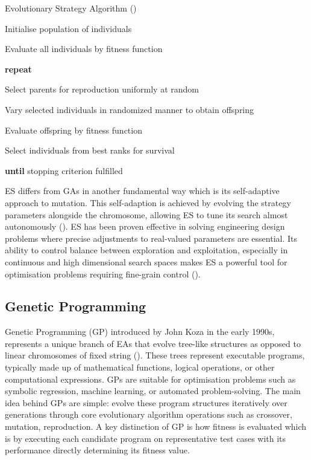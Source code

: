 \begin{algorithm}
	\caption{Evolutionary Strategy Algorithm (\cite{back2012handbook})}\label{alg:basic_evolutionary_strategy}
	\begin{algorithmic}[1]
	\item Initialise population of individuals
	\item Evaluate all individuals  by fitness function
	\item \textbf{repeat}
	\item \quad Select parents for reproduction uniformly at random
	\item \quad Vary selected individuals in randomized manner to obtain offspring
	\item \quad Evaluate offspring by fitness function
	\item \quad Select individuals from best ranks for survival
	\item \textbf{until} stopping criterion fulfilled
\end{algorithmic}
\end{algorithm}

\noindent ES differs from GAs in another fundamental way which is its self-adaptive approach to mutation. This self-adaption is achieved by evolving the strategy parameters alongside the chromosome, allowing ES to tune its search almost autonomously (\cite{back2012handbook}). ES has been proven effective in solving engineering design problems where precise adjustments to real-valued parameters are essential. Its ability to control balance between exploration and exploitation, especially in continuous and high dimensional search spaces makes ES a powerful tool for optimisation problems requiring fine-grain control (\cite{book_introduction_to_evolutionary_computing}). \bigskip

\subsection{Genetic Programming}\label{sec:genetic_programming}
Genetic Programming (GP) introduced by John Koza in the early 1990s, represents a unique branch of EAs that evolve tree-like structures as opposed to linear chromosomes of fixed string (\cite{koza1994genetic}). These trees represent executable programs, typically made up of mathematical functions, logical operations, or other computational expressions. GPs are suitable for optimisation problems such as symbolic regression, machine learning, or automated problem-solving. The main idea behind GPs are simple: evolve these program structures iteratively over generations through core evolutionary algorithm operations such as crossover, mutation, reproduction. A key distinction of GP is how fitness is evaluated which is by executing each candidate program on representative test cases with its performance directly determining its fitness value. \bigskip

